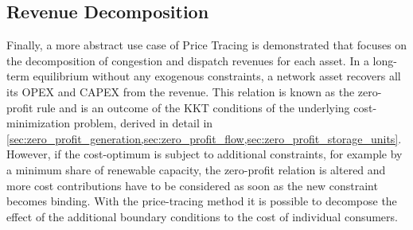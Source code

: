 \documentclass[11pt,twocolumn]{article}
\begin{document}





\subsection{Revenue Decomposition}

Finally, a more abstract use case of Price Tracing is demonstrated that focuses on the decomposition of congestion and dispatch revenues for each asset. In a long-term equilibrium without any exogenous constraints, a network asset recovers all its \ac{OPEX} and \ac{CAPEX} from the revenue. This relation is known as the zero-profit rule and is an outcome of the \ac{KKT} conditions of the underlying cost-minimization problem, derived in detail in \cref{sec:zero_profit_generation,sec:zero_profit_flow,sec:zero_profit_storage_units}. However, if the cost-optimum is subject to additional constraints, for example by a minimum share of renewable capacity, the zero-profit relation is altered and more cost contributions have to be considered \cite{brown_decreasing_2020} as soon as the new constraint becomes binding. With the price-tracing method it is possible to decompose the effect of the additional boundary conditions to the cost of individual consumers.
\end{document}
